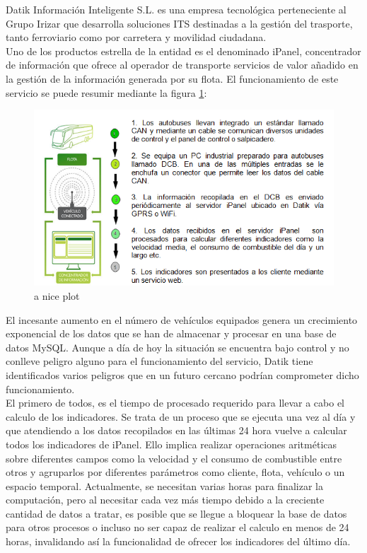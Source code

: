 Datik Información Inteligente S.L. es una empresa tecnológica perteneciente al Grupo Irizar  que desarrolla soluciones ITS destinadas a la gestión del trasporte, tanto ferroviario como por carretera y movilidad ciudadana.\\

Uno de los productos estrella de la entidad es el denominado iPanel, concentrador de  información que ofrece al operador de transporte servicios de valor añadido en la gestión de la información generada por su flota. El funcionamiento de este servicio se puede resumir mediante la figura \ref{fig:ipanel}:\\

\begin{figure}[h]
	\centering
	\includegraphics[width=1\textwidth]{Ilustraciones/ipanel_infraesctructure.png}
	\caption{a nice plot}
	\label{fig:ipanel}
\end{figure}

El incesante aumento en el número de vehículos equipados genera un crecimiento exponencial de los datos que se han de almacenar y procesar en una base de datos MySQL. Aunque a día de hoy la situación se encuentra bajo control y no conlleve peligro alguno para el funcionamiento del servicio, Datik tiene identificados varios peligros que en un futuro cercano podrían comprometer dicho funcionamiento.\\

El primero de todos, es el tiempo de procesado requerido para llevar a cabo el calculo de los indicadores. Se trata de un proceso que se ejecuta una vez al día y que atendiendo a los datos recopilados en las últimas 24 hora vuelve a calcular todos los indicadores de iPanel. Ello implica realizar operaciones aritméticas sobre diferentes campos como la velocidad y el consumo de combustible entre otros y agruparlos por diferentes parámetros como cliente, flota, vehículo o un espacio temporal. Actualmente, se necesitan varias horas para finalizar la computación, pero al necesitar cada vez más tiempo debido a la creciente cantidad de datos a tratar, es posible que se llegue a bloquear la base de datos para otros procesos o incluso no ser capaz de realizar el calculo en menos de 24 horas, invalidando así la funcionalidad de ofrecer los indicadores del último día.

